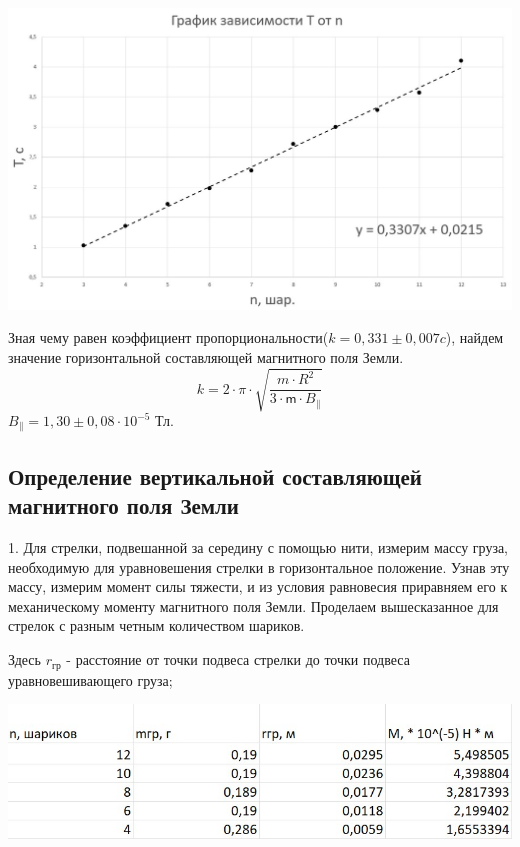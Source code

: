 \documentclass[a4paper,12pt]{article}
\begin{document}
\begin{center}
  \includegraphics[scale=0.7]{graphik.jpg}
  \label{fig:picture}
\end{center}

Зная чему равен коэффициент пропорциональности($k = 0,331 \pm 0,007 c$), найдем значение горизонтальной составляющей магнитного поля Земли.
\[k = 2 \cdot \pi \cdot \sqrt{\frac{m \cdot R^2}{3 \cdot \textsf{m} \cdot B_{\parallel}}}\]
$B_{\parallel} = 1,30 \pm 0,08 \cdot 10^{-5}$ Тл.

\subsection*{Определение вертикальной составляющей магнитного поля Земли}
1. Для стрелки, подвешанной за середину с помощью нити, измерим массу груза, необходимую для уравновешения стрелки в горизонтальное положение. Узнав эту массу, измерим момент силы тяжести, и из условия равновесия приравняем его к механическому моменту магнитного поля Земли. Проделаем вышесказанное для стрелок с разным четным количеством шариков.

Здесь $r_{\text{гр}}$ - расстояние от точки подвеса стрелки до точки подвеса уравновешивающего груза; 

\begin{center}
  \includegraphics[scale=0.7]{tabliza2.jpg}
  \label{fig:picture}
\end{center}
\end{document}
